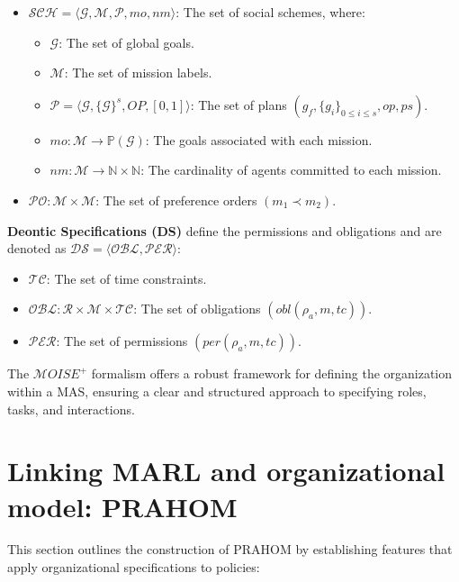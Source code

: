 \documentclass[conference]{IEEEtran}
\begin{document}
\begin{itemize}
    \item $\mathcal{SCH} = \langle \mathcal{G}, \mathcal{M}, \mathcal{P}, mo, nm \rangle$: The set of social schemes, where:
          \begin{itemize}
              \item $\mathcal{G}$: The set of global goals.
              \item $\mathcal{M}$: The set of mission labels.
              \item $\mathcal{P} = \langle \mathcal{G}, \{\mathcal{G}\}^s, OP, [0,1] \rangle$: The set of plans $(g_f, \{g_i\}_{0 \leq i \leq s}, op, ps)$.
              \item $mo: \mathcal{M} \rightarrow \mathbb{P}(\mathcal{G})$: The goals associated with each mission.
              \item $nm: \mathcal{M} \rightarrow \mathbb{N} \times \mathbb{N}$: The cardinality of agents committed to each mission.
          \end{itemize}
    \item $\mathcal{PO}: \mathcal{M} \times \mathcal{M}$: The set of preference orders $(m_1 \prec m_2)$.
\end{itemize}

\textbf{Deontic Specifications (DS)} define the permissions and obligations and are denoted as $\mathcal{DS} = \langle \mathcal{OBL}, \mathcal{PER} \rangle$:

\begin{itemize}
    \item $\mathcal{TC}$: The set of time constraints.
    \item $\mathcal{OBL}: \mathcal{R} \times \mathcal{M} \times \mathcal{TC}$: The set of obligations $(obl(\rho_a, m, tc))$.
    \item $\mathcal{PER}$: The set of permissions $(per(\rho_a, m, tc))$.
\end{itemize}

The $\mathcal{M}OISE^+$ formalism offers a robust framework for defining the organization within a MAS, ensuring a clear and structured approach to specifying roles, tasks, and interactions.



\section{Linking MARL and organizational model: PRAHOM}

This section outlines the construction of PRAHOM by establishing features that apply organizational specifications to policies:
\end{document}
